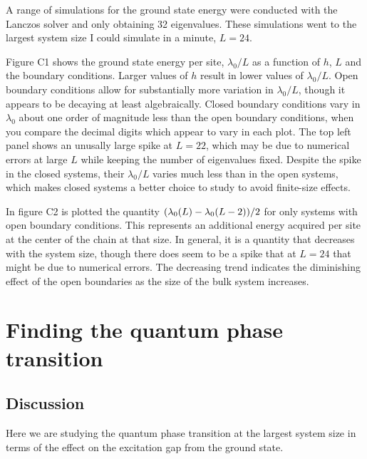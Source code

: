 \documentclass{article}
\begin{document}
A range of simulations for the ground state energy were
conducted with the Lanczos solver and only obtaining 
32 eigenvalues.
These simulations went to the largest system size I
could simulate in a minute, $L=24$.

{\centering



}

Figure C1 shows the ground state energy per site, $\lambda_0 / L$
as a function of $h$, $L$ and the boundary conditions.
Larger values of $h$ result in lower values of $\lambda_0 / L$.
Open boundary conditions allow for substantially more variation
in $\lambda_0 / L$, though it appears to be decaying at least
algebraically.
Closed boundary conditions vary in $\lambda_0$ about one order
of magnitude less than the open boundary conditions, when you
compare the decimal digits which appear to vary in each plot.
The top left panel shows an unusally large spike at $L=22$,
which may be due to numerical errors at large $L$ while keeping
the number of eigenvalues fixed.
Despite the spike in the closed systems, their $\lambda_0 / L$
varies much less than in the open systems, which makes closed
systems a better choice to study to avoid finite-size effects.

In figure C2 is plotted the quantity $\qty( \lambda_0(L) - \lambda_0(L-2)) / 2$
for only systems with open boundary conditions.
This represents an additional energy acquired per site at the center of the chain
at that size.
In general, it is a quantity that decreases with the system size, though
there does seem to be a spike that at $L=24$ that might be due to numerical
errors.
The decreasing trend indicates the diminishing effect of the open boundaries
as the size of the bulk system increases.

{\centering



}

\newpage

\section{
Finding the quantum phase transition
}


\subsection{
Discussion
}

Here we are studying the quantum phase transition
at the largest system size in terms of the effect on
the excitation gap from the ground state.
\end{document}
